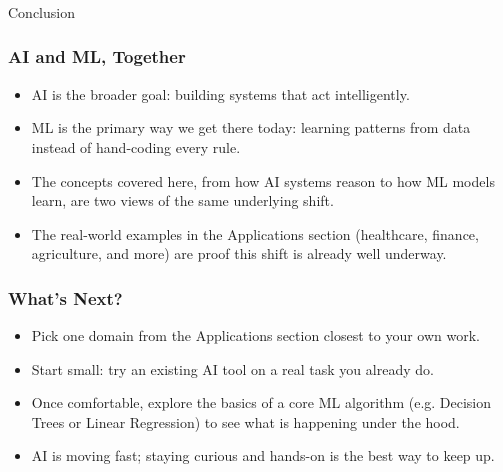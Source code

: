 \begin{frame}[fragile]\frametitle{}
\begin{center}
{\Large Conclusion}
\end{center}
\end{frame}

\begin{frame}[fragile]\frametitle{AI and ML, Together}
\begin{itemize}
\item AI is the broader goal: building systems that act intelligently.
\item ML is the primary way we get there today: learning patterns from data instead of hand-coding every rule.
\item The concepts covered here, from how AI systems reason to how ML models learn, are two views of the same underlying shift.
\item The real-world examples in the Applications section (healthcare, finance, agriculture, and more) are proof this shift is already well underway.
\end{itemize}
\end{frame}

\begin{frame}[fragile]\frametitle{What's Next?}
\begin{itemize}
\item Pick one domain from the Applications section closest to your own work.
\item Start small: try an existing AI tool on a real task you already do.
\item Once comfortable, explore the basics of a core ML algorithm (e.g. Decision Trees or Linear Regression) to see what is happening under the hood.
\item AI is moving fast; staying curious and hands-on is the best way to keep up.
\end{itemize}
\end{frame}
